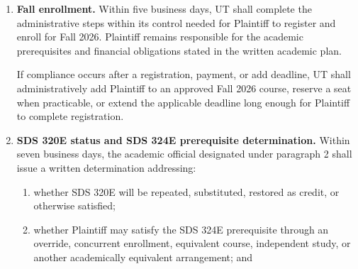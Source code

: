 \documentclass[12pt]{article}
\begin{document}
\begin{enumerate}
\begin{enumerate}[label=(\alph*),leftmargin=0.45in]
  \item the remaining Statistics and Data Science minor requirements;

  \item the certificate coursework Plaintiff has included in the Fall 2026 academic plan;

  \item the remaining residence-hour requirement and the official assigned to decide any pending or renewed residence-hour petition;

  \item elective credit that may be completed in Fall 2026 or a summer term;

  \item Fall 2026 courses with available seats or approved equivalents; and

  \item the earliest completion date under each available SDS 320E status and SDS 324E prerequisite option.
  \end{enumerate}

\item \textbf{Fall enrollment.} Within five business days, UT shall complete the administrative steps within its control needed for Plaintiff to register and enroll for Fall 2026. Plaintiff remains responsible for the academic prerequisites and financial obligations stated in the written academic plan.

If compliance occurs after a registration, payment, or add deadline, UT shall administratively add Plaintiff to an approved Fall 2026 course, reserve a seat when practicable, or extend the applicable deadline long enough for Plaintiff to complete registration.

\item \textbf{SDS 320E status and SDS 324E prerequisite determination.} Within seven business days, the academic official designated under paragraph 2 shall issue a written determination addressing:

  \begin{enumerate}[label=(\alph*),leftmargin=0.45in]
  \item whether SDS 320E will be repeated, substituted, restored as credit, or otherwise satisfied;

  \item whether Plaintiff may satisfy the SDS 324E prerequisite through an override, concurrent enrollment, equivalent course, independent study, or another academically equivalent arrangement; and


\end{enumerate}
\end{enumerate}
\end{document}
